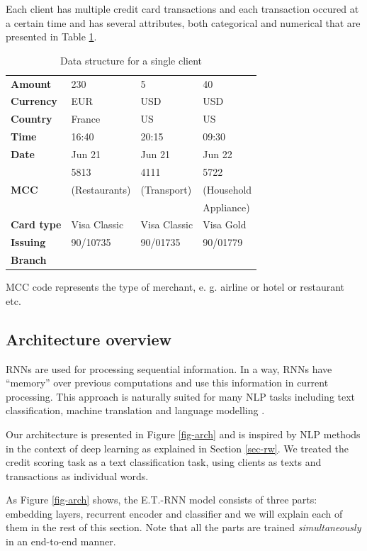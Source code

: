 \documentclass[sigconf]{acmart}
\begin{document}
Each client has multiple credit card transactions and each transaction occured at a certain time and has several attributes, both categorical and numerical that are presented in Table \ref{tab-tr-data}. 

\begin{table}[ht]
\caption{Data structure for a single client}
\begin{tabular}{ | l |  l l l | }
\hline
\textbf{Amount} & 230 & 5 & 40 \\
\textbf{Currency} & EUR & USD & USD \\
\textbf{Country} & France & US & US \\
\textbf{Time} & 16:40 & 20:15 & 09:30 \\
\textbf{Date} & Jun 21 & Jun 21 & Jun 22 \\
 & 5813 & 4111 & 5722 \\
\textbf{MCC} & (Restaurants) & (Transport) & (Household \\
&  &  & Appliance) \\
\textbf{Card type} & Visa Classic & Visa Classic & Visa Gold \\
\textbf{Issuing} & 90/10735 & 90/01735 & 90/01779 \\
\textbf{Branch} &&& \\
\hline
\end{tabular}
\label{tab-tr-data}
\end{table}

MCC code represents the type of merchant, e. g. airline or hotel or restaurant etc.

\subsection{Architecture overview}

RNNs are used for processing sequential information.  In a way, RNNs have “memory” over previous computations and use this information in current processing. This approach is naturally suited for many NLP tasks including text classification, machine translation and language modelling \cite{mikolov2010recurrent}.

Our architecture is presented in Figure \ref{fig-arch} and is inspired by NLP methods in the context of deep learning as explained in Section \ref{sec-rw}. We treated the credit scoring task as a text classification task, using clients as texts and transactions as individual words.

As Figure \ref{fig-arch} shows, the E.T.-RNN model consists of three parts: embedding layers, recurrent encoder and classifier and we will explain each of them in the rest of this section. Note that all the parts are trained \textit{simultaneously} in an end-to-end manner.
\end{document}
